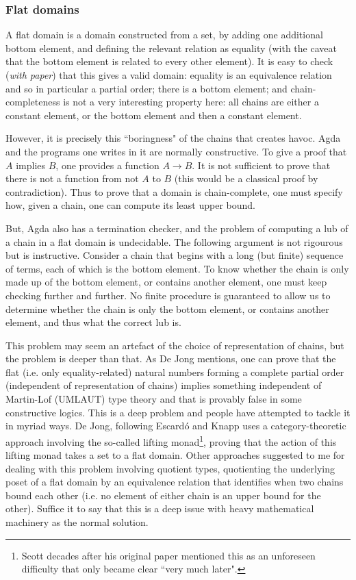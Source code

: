 \documentclass[12pt,a4paper,twoside,openright]{report}
\begin{document}
\subsubsection{Flat domains}
A flat domain is a domain constructed from a set, by adding one additional bottom element, and defining the relevant relation as equality (with the caveat that the bottom element is related to every other element). It is easy to check (\textit{with paper}) that this gives a valid domain: equality is an equivalence relation and so in particular a partial order; there is a bottom element; and chain-completeness is not a very interesting property here: all chains are either a constant element, or the bottom element and then a constant element.

However, it is precisely this ``boringness" of the chains that creates havoc. Agda and the programs one writes in it are normally constructive. To give a proof that $A$ implies $B$, one provides a function $A \to B$. It is not sufficient to prove that there is not a function from not $A$ to $B$ (this would be a classical proof by contradiction). Thus to prove that a domain is chain-complete, one must specify how, given a chain, one can compute its least upper bound. 

But, Agda also has a termination checker, and the problem of computing a lub of a chain in a flat domain is undecidable. The following argument is not rigourous but is instructive. Consider a chain that begins with a long (but finite) sequence of terms, each of which is the bottom element. To know whether the chain is only made up of the bottom element, or contains another element, one must keep checking further and further. No finite procedure is guaranteed to allow us to determine whether the chain is only the bottom element, or contains another element, and thus what the correct lub is. 

This problem may seem an artefact of the choice of representation of chains, but the problem is deeper than that. As De Jong \cite{De-Jong} mentions, one can prove that the flat (i.e. only equality-related) natural numbers forming a complete partial order (independent of representation of chains) implies something independent of Martin-Lof (UMLAUT) type theory and that is provably false in some constructive logics. This is a deep problem and people have attempted to tackle it in myriad ways. De Jong, following Escardó and Knapp \cite{Escardo} uses a category-theoretic approach involving the so-called lifting monad\footnote{Scott decades after his original paper mentioned this as an unforeseen difficulty that only became clear ``very much later".}, proving that the action of this lifting monad takes a set to a flat domain. Other approaches suggested to me for dealing with this problem involving quotient types, quotienting the underlying poset of a flat domain by an equivalence relation that identifies when two chains bound each other (i.e. no element of either chain is an upper bound for the other). Suffice it to say that this is a deep issue with heavy mathematical machinery as the normal solution. 
\end{document}

